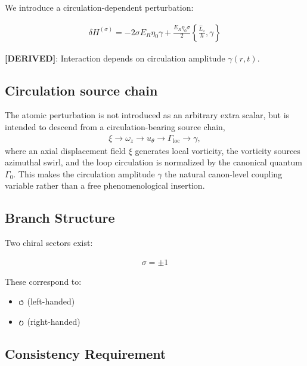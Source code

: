\documentclass[11pt]{article}
\theoremstyle{definition}
\theoremstyle{plain}
\theoremstyle{remark}
\newcommand{\swirlarrow}{\mathchoice{\mkern-2mu\scriptstyle\boldsymbol{\circlearrowleft}}{\mkern-2mu\scriptstyle\boldsymbol{\circlearrowleft}}{\mkern-2mu\scriptscriptstyle\boldsymbol{\circlearrowleft}}{\mkern-2mu\scriptscriptstyle\boldsymbol{\circlearrowleft}}}
\newcommand{\swirlarrowcw}{\mathchoice{\mkern-2mu\scriptstyle\boldsymbol{\circlearrowright}}{\mkern-2mu\scriptstyle\boldsymbol{\circlearrowright}}{\mkern-2mu\scriptscriptstyle\boldsymbol{\circlearrowright}}{\mkern-2mu\scriptscriptstyle\boldsymbol{\circlearrowright}}}
\begin{document}
        We introduce a circulation-dependent perturbation:
        
        \begin{align}
            \delta H^{(\sigma)} = -2\sigma E_R \eta_0 \gamma + \frac{E_R \eta_0 \sigma}{2} \left\{ \frac{\hat{L}_z}{\hbar}, \gamma \right\}
            \label{eq:sst_correction}
        \end{align}
        
        \textbf{[DERIVED]}: Interaction depends on circulation amplitude $\gamma(r,t)$.

    \subsection{Circulation source chain}
        The atomic perturbation is not introduced as an arbitrary extra scalar, but is intended to descend from a circulation-bearing source chain,
        \begin{align}
            \xi \rightarrow \omega_z \rightarrow u_\theta \rightarrow \Gamma_{\mathrm{loc}} \rightarrow \gamma,
        \end{align}
        where an axial displacement field $\xi$ generates local vorticity, the vorticity sources azimuthal swirl, and the loop circulation is normalized by the canonical quantum $\Gamma_0$. This makes the circulation amplitude $\gamma$ the natural canon-level coupling variable rather than a free phenomenological insertion.
    
    \subsection{Branch Structure}
        
        Two chiral sectors exist:
        
        \begin{align}
            \sigma = \pm 1
        \end{align}
        
        These correspond to:
        
        \begin{itemize}
            \item $\swirlarrow$ (left-handed)
            \item $\swirlarrowcw$ (right-handed)
        \end{itemize}
    
    \subsection{Consistency Requirement}
        
\end{document}

